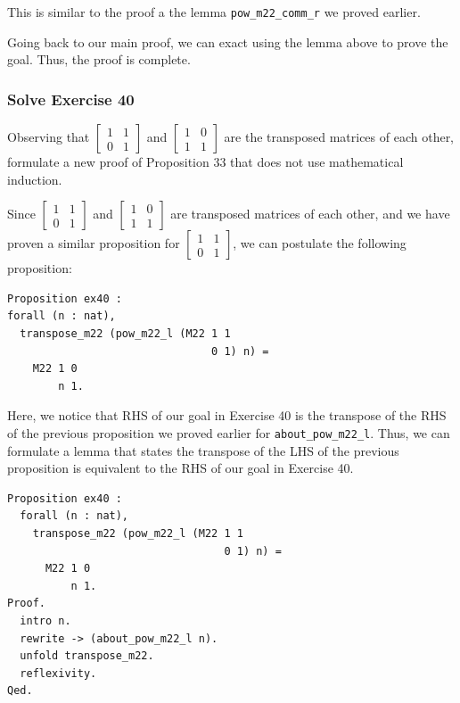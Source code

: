 \documentclass{article}
\begin{document}
This is similar to the proof a the lemma \texttt{pow\_m22\_comm\_r} we proved earlier. 

Going back to our main proof, we can exact using the lemma above to prove the goal. Thus, the proof is complete.

\subsubsection{Solve Exercise 40}

Observing that $\left[\begin{array}{ll}1 & 1 \\ 0 & 1\end{array}\right]$ and $\left[\begin{array}{ll}1 & 0 \\ 1 & 1\end{array}\right]$ are the transposed matrices of each other, formulate a new proof of Proposition 33 that does not use mathematical induction.

Since $\left[\begin{array}{ll}1 & 1 \\ 0 & 1\end{array}\right]$ and $\left[\begin{array}{ll}1 & 0 \\ 1 & 1\end{array}\right]$ are transposed matrices of each other, and we have proven a similar proposition for $\left[\begin{array}{ll}1 & 1 \\ 0 & 1\end{array}\right]$, we can postulate the following proposition:

\begin{lstlisting}
Proposition ex40 :
forall (n : nat),
  transpose_m22 (pow_m22_l (M22 1 1
                                0 1) n) =
    M22 1 0
        n 1.
\end{lstlisting}

Here, we notice that RHS of our goal in Exercise 40 is the transpose of the RHS of the previous proposition we proved earlier for \texttt{about\_pow\_m22\_l}. Thus, we can formulate a lemma that states the transpose of the LHS of the previous proposition is equivalent to the RHS of our goal in Exercise 40. 
\begin{lstlisting}
Proposition ex40 :
  forall (n : nat),
    transpose_m22 (pow_m22_l (M22 1 1
                                  0 1) n) =
      M22 1 0
          n 1.
Proof.
  intro n.
  rewrite -> (about_pow_m22_l n).
  unfold transpose_m22.
  reflexivity.
Qed.
\end{lstlisting}
\end{document}
